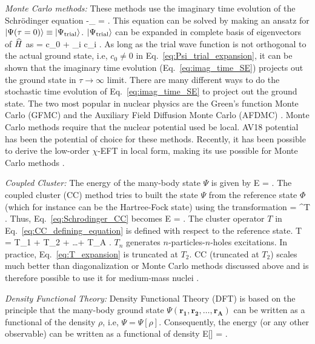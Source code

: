 	\li
	\emph{Monte Carlo methods:}
	These methods use the imaginary time evolution of the Schr\"{o}dinger
	equation
	\beq
	-\partial_\tau \ket{\Psi(\tau)} =  \ket{\Psi(\tau)} \;.
	\label{eq:imag_time_SE}
	\eeq
	This equation can be solved by making an ansatz for
	${|\Psi(\tau = 0)\rangle} \equiv {|\Psi_{\rm trial}\rangle}$.
	${|\Psi_{\rm trial}\rangle}$ can be expanded in complete basis of eigenvectors
	of $\widehat{H}$ as
	\beq
	 = c_0  +
	\sum_{i } c_i  \;.
	\label{eq:Psi_trial_expansion}
	\eeq
	As long as the trial wave function is not orthogonal to the actual ground
	state, i.e, $c_0 \neq 0$ in Eq.~\eqref{eq:Psi_trial_expansion}, it can
	be shown that the imaginary time evolution (Eq.~\eqref{eq:imag_time_SE})
	projects out the ground state in $\tau \to \infty$ limit.  There are many
	different ways to do the stochastic time evolution of
	Eq.~\eqref{eq:imag_time_SE} to project out the ground state.  The two
	most popular in nuclear physics are the Green's function Monte Carlo (GFMC)
	\cite{Pieper:2002ne, Pieper:2007ax}
	and the Auxiliary Field Diffusion Monte Carlo (AFDMC)
	\cite{Gandolfi:2007hs, Gezerlis:2014zia}.  Monte Carlo methods require that
	the nuclear potential used be local.  AV18 potential has been the potential
	of choice for these methods.  Recently, it has been possible to
	derive the low-order $\chi$-EFT in local form, making its use possible
	for Monte Carlo methods \cite{Gezerlis:2014zia}.

	\li
	\emph{Coupled Cluster:} The energy of the many-body state $\Psi$ is given
	by
	\beq
	E = \;.
	\label{eq:Schrodinger_CC}
	\eeq
	The coupled cluster (CC) method tries to built the state $\Psi$ from the
	reference state $\Phi$ (which for instance can be the Hartree-Fock state)
	using the transformation
	\beq
	\ket{\Psi} = \ee^T \ket{\Phi}\;.
	\label{eq:CC_defining_equation}
	\eeq
	Thus, Eq.~\eqref{eq:Schrodinger_CC} becomes
	\beq
	E = \;.
	\eeq
	The cluster operator $T$ in Eq.~\eqref{eq:CC_defining_equation}
	is defined with respect to the reference state.
	\beq
	T = T_1 + T_2 + \ldots + T_A \;.
	\label{eq:T_expansion}
	\eeq
	$T_n$ generates $n$-particles-$n$-holes excitations.  In practice,
	Eq.~\eqref{eq:T_expansion} is truncated at $T_2$.  CC (truncated at $T_2$)
	scales much better than diagonalization or Monte Carlo methods discussed
	above and is therefore possible to use it for medium-mass nuclei
	\cite{Hagen:2013nca}.

	\li
	\emph{Density Functional Theory:} Density Functional Theory (DFT) is based
	on the principle that the many-body ground state $\Psi(\bm{r_1}, \bm{r_2},
	\ldots, \bm{r_A})$ can be written as a functional of the density $\rho$,
	i.e, $\Psi = \Psi[\rho]$.
	Consequently, the energy (or any other observable) can be written
	as a functional of density
	\beq
	E[\rho] =  \;.
	\eeq


